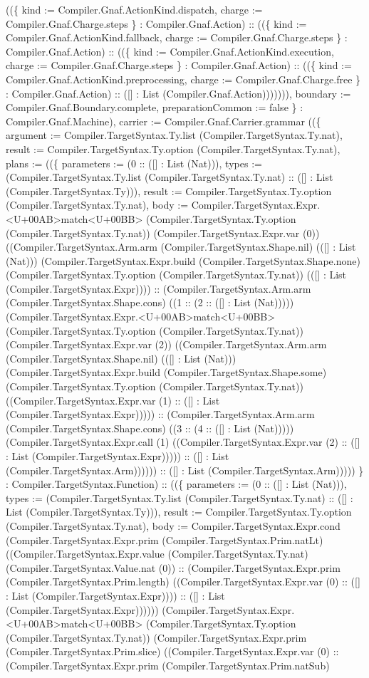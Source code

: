 \documentclass[11pt]{article}
\begin{document}
((\{ kind := Compiler.Gnaf.ActionKind.dispatch, charge := Compiler.Gnaf.Charge.steps \} : Compiler.Gnaf.Action) :: ((\{ kind := Compiler.Gnaf.ActionKind.fallback, charge := Compiler.Gnaf.Charge.steps \} : Compiler.Gnaf.Action) :: ((\{ kind := Compiler.Gnaf.ActionKind.execution, charge := Compiler.Gnaf.Charge.steps \} : Compiler.Gnaf.Action) :: ((\{ kind := Compiler.Gnaf.ActionKind.preprocessing, charge := Compiler.Gnaf.Charge.free \} : Compiler.Gnaf.Action) :: ([] : List (Compiler.Gnaf.Action))))))), boundary := Compiler.Gnaf.Boundary.complete, preparationCommon := false \} : Compiler.Gnaf.Machine), carrier := Compiler.Gnaf.Carrier.grammar ((\{ argument := Compiler.TargetSyntax.Ty.list (Compiler.TargetSyntax.Ty.nat), result := Compiler.TargetSyntax.Ty.option (Compiler.TargetSyntax.Ty.nat), plans := ((\{ parameters := (0 :: ([] : List (Nat))), types := (Compiler.TargetSyntax.Ty.list (Compiler.TargetSyntax.Ty.nat) :: ([] : List (Compiler.TargetSyntax.Ty))), result := Compiler.TargetSyntax.Ty.option (Compiler.TargetSyntax.Ty.nat), body := Compiler.TargetSyntax.Expr.<U+00AB>match<U+00BB> (Compiler.TargetSyntax.Ty.option (Compiler.TargetSyntax.Ty.nat)) (Compiler.TargetSyntax.Expr.var (0)) ((Compiler.TargetSyntax.Arm.arm (Compiler.TargetSyntax.Shape.nil) (([] : List (Nat))) (Compiler.TargetSyntax.Expr.build (Compiler.TargetSyntax.Shape.none) (Compiler.TargetSyntax.Ty.option (Compiler.TargetSyntax.Ty.nat)) (([] : List (Compiler.TargetSyntax.Expr)))) :: (Compiler.TargetSyntax.Arm.arm (Compiler.TargetSyntax.Shape.cons) ((1 :: (2 :: ([] : List (Nat))))) (Compiler.TargetSyntax.Expr.<U+00AB>match<U+00BB> (Compiler.TargetSyntax.Ty.option (Compiler.TargetSyntax.Ty.nat)) (Compiler.TargetSyntax.Expr.var (2)) ((Compiler.TargetSyntax.Arm.arm (Compiler.TargetSyntax.Shape.nil) (([] : List (Nat))) (Compiler.TargetSyntax.Expr.build (Compiler.TargetSyntax.Shape.some) (Compiler.TargetSyntax.Ty.option (Compiler.TargetSyntax.Ty.nat)) ((Compiler.TargetSyntax.Expr.var (1) :: ([] : List (Compiler.TargetSyntax.Expr))))) :: (Compiler.TargetSyntax.Arm.arm (Compiler.TargetSyntax.Shape.cons) ((3 :: (4 :: ([] : List (Nat))))) (Compiler.TargetSyntax.Expr.call (1) ((Compiler.TargetSyntax.Expr.var (2) :: ([] : List (Compiler.TargetSyntax.Expr))))) :: ([] : List (Compiler.TargetSyntax.Arm)))))) :: ([] : List (Compiler.TargetSyntax.Arm))))) \} : Compiler.TargetSyntax.Function) :: ((\{ parameters := (0 :: ([] : List (Nat))), types := (Compiler.TargetSyntax.Ty.list (Compiler.TargetSyntax.Ty.nat) :: ([] : List (Compiler.TargetSyntax.Ty))), result := Compiler.TargetSyntax.Ty.option (Compiler.TargetSyntax.Ty.nat), body := Compiler.TargetSyntax.Expr.cond (Compiler.TargetSyntax.Expr.prim (Compiler.TargetSyntax.Prim.natLt) ((Compiler.TargetSyntax.Expr.value (Compiler.TargetSyntax.Ty.nat) (Compiler.TargetSyntax.Value.nat (0)) :: (Compiler.TargetSyntax.Expr.prim (Compiler.TargetSyntax.Prim.length) ((Compiler.TargetSyntax.Expr.var (0) :: ([] : List (Compiler.TargetSyntax.Expr)))) :: ([] : List (Compiler.TargetSyntax.Expr)))))) (Compiler.TargetSyntax.Expr.<U+00AB>match<U+00BB> (Compiler.TargetSyntax.Ty.option (Compiler.TargetSyntax.Ty.nat)) (Compiler.TargetSyntax.Expr.prim (Compiler.TargetSyntax.Prim.slice) ((Compiler.TargetSyntax.Expr.var (0) :: (Compiler.TargetSyntax.Expr.prim (Compiler.TargetSyntax.Prim.natSub) 
\end{document}
